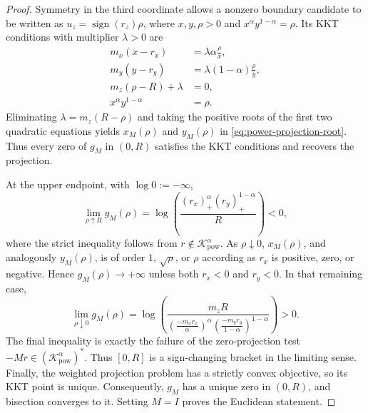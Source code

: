 \documentclass[letterpaper]{article} %
\theoremstyle{definition}
\theoremstyle{remark}
\begin{document}
\begin{proof}
Symmetry in the third coordinate allows a nonzero boundary candidate to be
written as $u_z=\operatorname{sign}(r_z)\rho$, where
$x,y,\rho>0$ and $x^\alpha y^{1-\alpha}=\rho$. Its KKT conditions with
multiplier $\lambda>0$ are
\begin{equation}
\label{eq:power-cone-projection-kkt}
\begin{aligned}
    m_x(x-r_x)&=\lambda\alpha\frac{\rho}{x},\\
    m_y(y-r_y)&=\lambda(1-\alpha)\frac{\rho}{y},\\
    m_z(\rho-R)+\lambda&=0,\\
    x^\alpha y^{1-\alpha}&=\rho.
\end{aligned}
\end{equation}
Eliminating $\lambda=m_z(R-\rho)$ and taking the positive roots of the first
two quadratic equations yields $x_M(\rho)$ and $y_M(\rho)$ in
\eqref{eq:power-projection-root}. Thus every zero of $g_M$ in $(0,R)$
satisfies the KKT conditions and recovers the projection.

At the upper endpoint, with $\log 0:=-\infty$,
\begin{equation}
\label{eq:power-cone-upper-endpoint-limit}
    \lim_{\rho\uparrow R}g_M(\rho)
    =\log\left(\frac{(r_x)_+^\alpha(r_y)_+^{1-\alpha}}{R}\right)<0,
\end{equation}
where the strict inequality follows from
$r\notin\mathcal K_{\mathrm{pow}}^\alpha$. As $\rho\downarrow0$,
$x_M(\rho)$, and analogously $y_M(\rho)$, is of order $1$, $\sqrt\rho$, or
$\rho$ according as $r_x$ is positive, zero, or negative. Hence
$g_M(\rho)\to+\infty$ unless both
$r_x<0$ and $r_y<0$. In that remaining case,
\begin{equation}
\label{eq:power-cone-lower-endpoint-limit}
    \lim_{\rho\downarrow0}g_M(\rho)
    =\log\left(
    \frac{m_zR}
    {\left(\frac{-m_xr_x}{\alpha}\right)^\alpha
     \left(\frac{-m_yr_y}{1-\alpha}\right)^{1-\alpha}}
    \right)>0.
\end{equation}
The final inequality is exactly the failure of the zero-projection test
$-Mr\in(\mathcal K_{\mathrm{pow}}^\alpha)^*$. Thus $[0,R]$ is a
sign-changing bracket in the limiting sense. Finally, the weighted projection
problem has a strictly convex objective, so its KKT point is unique.
Consequently, $g_M$ has a unique zero in $(0,R)$, and bisection converges to
it. Setting $M=I$ proves the Euclidean statement.
\end{proof}
\end{document}
